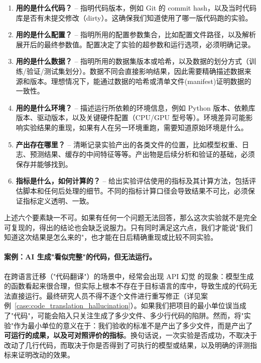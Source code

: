 \begin{enumerate}
  \item \textbf{用的是什么代码？} – 指明代码版本，例如 Git 的 commit hash，以及当时代码库是否有未提交修改（dirty）。这确保我们知道使用了哪一版代码跑的实验。

  \item \textbf{用的是什么配置？} – 指明所用的配置参数集合，比如配置文件路径，以及解析展开后的最终参数值。配置决定了实验的超参数和运行选项，必须明确记录。

  \item \textbf{用的是什么数据？} – 指明所用的数据集版本或哈希，以及数据的划分方式（训练/验证/测试集划分）。数据不同会直接影响结果，因此需要精确描述数据来源和版本。理想情况下，能通过数据的哈希或清单文件(manifest)证明数据的一致性。

  \item \textbf{用的是什么环境？} – 描述运行所依赖的环境信息，例如 Python 版本、依赖库版本、驱动版本，以及关键硬件配置（CPU/GPU 型号等）。环境差异可能影响实验结果的重现，如果有人在另一环境重跑，需要知道原始环境是什么。

  \item \textbf{产出存在哪里？} – 清晰记录实验产出的各类文件的位置，比如模型权重、日志、预测结果、缓存的中间特征等等。产出物是后续分析和验证的基础，必须保存并能够找到。

  \item \textbf{指标是什么，如何计算的？} – 给出实验评估使用的指标及其计算方法，包括评估脚本和任何后处理的细节。不同的指标计算口径会导致结果不可比，必须保证指标定义透明、一致。
\end{enumerate}

上述六个要素缺一不可。如果有任何一个问题无法回答，那么这次实验就不是完全可复现的，得出的结论也会缺乏说服力。只有同时满足这六点，我们才能说"我们知道这次结果是怎么来的"，也才能在日后精确重现或比较不同实验。

\paragraph{案例：AI 生成"看似完整"的代码，但无法运行。}
在跨语言迁移（"代码翻译"）的场景中，经常会出现 API 幻觉 的现象：模型生成的函数看起来很合理，但实际上根本不存在于目标语言的库中，导致生成的代码无法直接运行。最终研究人员不得不逐个文件进行重写修正（详见案例~\ref{case:code_translation_hallucination}）。如果我们把项目的最小单位误当成了"代码"，可能会陷入只关注生成了多少文件、多少行代码的陷阱。然而，将"实验"作为最小单位的意义在于：我们验收的标准不是产出了多少文件，而是产出了\textbf{可运行的成果，以及可对照评价的指标}。换句话说，一次实验是否成功，不取决于改动了几行代码，而取决于你是否得到了可执行的模型或结果，以及明确的评测指标来证明改动的效果。

